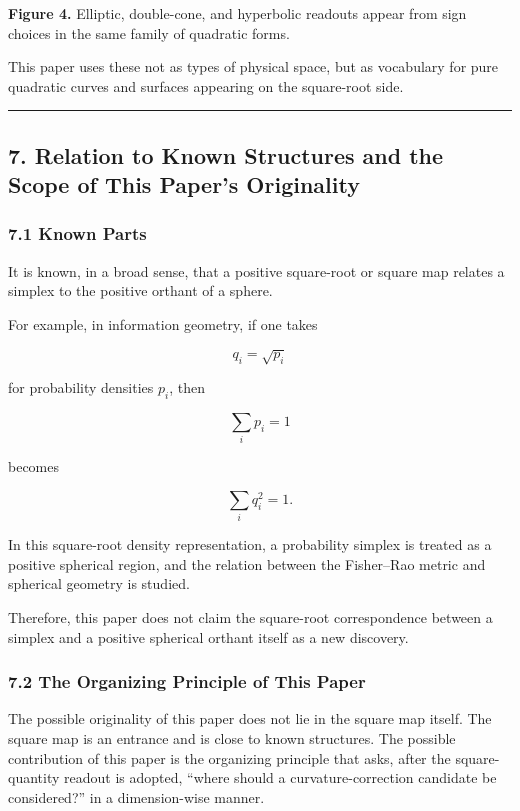 \documentclass[
]{ltjsarticle}
\begin{document}
\textbf{Figure 4.} Elliptic, double-cone, and hyperbolic readouts appear
from sign choices in the same family of quadratic forms.

This paper uses these not as types of physical space, but as vocabulary
for pure quadratic curves and surfaces appearing on the square-root
side.

\begin{center}\rule{0.5\linewidth}{0.5pt}\end{center}

\subsection{7. Relation to Known Structures and the Scope of This
Paper's
Originality}\label{relation-to-known-structures-and-the-scope-of-this-papers-originality}

\subsubsection{7.1 Known Parts}\label{known-parts}

It is known, in a broad sense, that a positive square-root or square map
relates a simplex to the positive orthant of a sphere.

For example, in information geometry, if one takes

\[
q_i=\sqrt{p_i}
\]

for probability densities \(p_i\), then

\[
\sum_i p_i=1
\]

becomes

\[
\sum_i q_i^2=1.
\]

In this square-root density representation, a probability simplex is
treated as a positive spherical region, and the relation between the
Fisher--Rao metric and spherical geometry is studied.

Therefore, this paper does not claim the square-root correspondence
between a simplex and a positive spherical orthant itself as a new
discovery.

\subsubsection{7.2 The Organizing Principle of This
Paper}\label{the-organizing-principle-of-this-paper}

The possible originality of this paper does not lie in the square map
itself. The square map is an entrance and is close to known structures.
The possible contribution of this paper is the organizing principle that
asks, after the square-quantity readout is adopted, ``where should a
curvature-correction candidate be considered?'' in a dimension-wise
manner.
\end{document}
